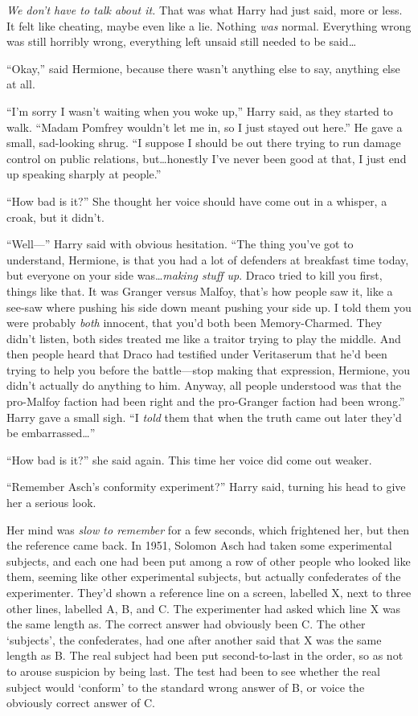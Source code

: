 \emph{We don’t have to talk about it.} That was what Harry had just said, more or less. It felt like cheating, maybe even like a lie. Nothing \emph{was} normal. Everything wrong was still horribly wrong, everything left unsaid still needed to be said…

“Okay,” said Hermione, because there wasn’t anything else to say, anything else at all.

“I’m sorry I wasn’t waiting when you woke up,” Harry said, as they started to walk. “Madam Pomfrey wouldn’t let me in, so I just stayed out here.” He gave a small, sad-looking shrug. “I suppose I should be out there trying to run damage control on public relations, but…honestly I’ve never been good at that, I just end up speaking sharply at people.”

“How bad is it?” She thought her voice should have come out in a whisper, a croak, but it didn’t.

“Well—” Harry said with obvious hesitation. “The thing you’ve got to understand, Hermione, is that you had a lot of defenders at breakfast time today, but everyone on your side was…\emph{making stuff up}. Draco tried to kill you first, things like that. It was Granger versus Malfoy, that’s how people saw it, like a see-saw where pushing his side down meant pushing your side up. I told them you were probably \emph{both} innocent, that you’d both been Memory-Charmed. They didn’t listen, both sides treated me like a traitor trying to play the middle. And then people heard that Draco had testified under Veritaserum that he’d been trying to help you before the battle—stop making that expression, Hermione, you didn’t actually do anything to him. Anyway, all people understood was that the pro-Malfoy faction had been right and the pro-Granger faction had been wrong.” Harry gave a small sigh. “I \emph{told} them that when the truth came out later they’d be embarrassed…”

“How bad is it?” she said again. This time her voice did come out weaker.

“Remember Asch’s conformity experiment?” Harry said, turning his head to give her a serious look.

Her mind was \emph{slow to remember} for a few seconds, which frightened her, but then the reference came back. In 1951, Solomon Asch had taken some experimental subjects, and each one had been put among a row of other people who looked like them, seeming like other experimental subjects, but actually confederates of the experimenter. They’d shown a reference line on a screen, labelled X, next to three other lines, labelled A, B, and C\@. The experimenter had asked which line X was the same length as. The correct answer had obviously been C\@. The other ‘subjects’, the confederates, had one after another said that X was the same length as B\@. The real subject had been put second-to-last in the order, so as not to arouse suspicion by being last. The test had been to see whether the real subject would ‘conform’ to the standard wrong answer of B, or voice the obviously correct answer of C\@.

